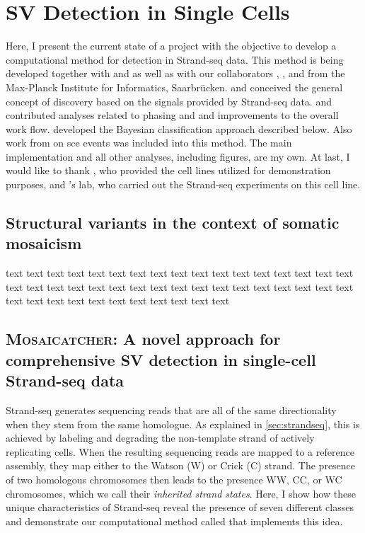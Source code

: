 \chapter{SV Detection in Single Cells}
\label{sec:mosaicatcher}

Here, I present the current state of a project with the objective to develop a
computational method for \sv detection in Strand-seq data. This method is being
developed together with \jan and \ashley as well as with our collaborators
\david, \maryam, and \marschall from the Max-Planck Institute for Informatics,
Saarbrücken. \ashley and \jan conceived the general concept of \sv discovery
based on the signals provided by Strand-seq data. \marschall and \david
contributed analyses related to phasing and and improvements to the overall work
flow. \maryam developed the Bayesian classification approach described below.
Also work from \venla on \acl{sce} events was included into this method.
The main implementation and all other analyses, including figures, are my own.
At last, I would like to thank \balca, who provided the cell lines utilized for
demonstration purposes, and \landsdorp's lab, who carried out the Strand-seq
experiments on this cell line.





\section{Structural variants in the context of somatic mosaicism}
\label{sec:mosaic_mosaicism}

text text text text text text text text text text text text text text text
text text text text text text text text text text text text text text text
text text text text text text text text text text text text text text text





\section{\textsc{Mosaicatcher}: A novel approach for comprehensive SV detection in single-cell Strand-seq data}
\label{sec:mosaic_mc}

Strand-seq generates sequencing reads that are all of the same directionality
when they stem from the same homologue. As explained in \cref{sec:strandseq},
this is achieved by labeling and degrading the non-template strand of
actively replicating cells. When the resulting sequencing reads are mapped to a
reference assembly, they map either to the Watson (W) or Crick (C) strand. The
presence of two homologous chromosomes then leads to the presence WW, CC, or WC
chromosomes, which we call their \emph{inherited strand states}.
Here, I show how these unique characteristics of Strand-seq reveal the presence
of seven different \sv classes and demonstrate our computational method called
\mc that implements this idea.


